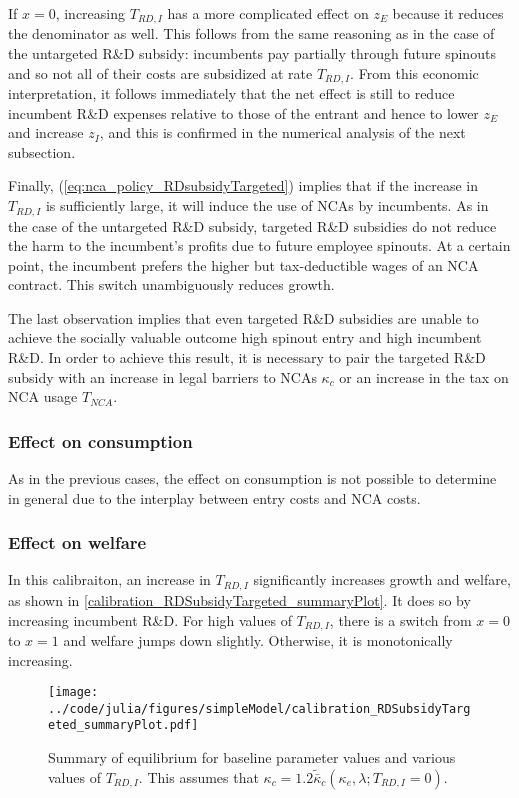 \documentclass[11pt,english]{article}
\theoremstyle{remark}
\begin{document}
If $x = 0$, increasing $T_{RD,I}$ has a more complicated effect on $z_E$ because it reduces the denominator as well. This follows from the same reasoning as in the case of the untargeted R\&D subsidy: incumbents pay partially through future spinouts and so not all of their costs are subsidized at rate $T_{RD,I}$. From this economic interpretation, it follows immediately that the net effect is still to reduce incumbent R\&D expenses relative to those of the entrant and hence to lower $z_E$ and increase $z_I$, and this is confirmed in the numerical analysis of the next subsection.

Finally, (\ref{eq:nca_policy_RDsubsidyTargeted}) implies that if the increase in $T_{RD,I}$ is sufficiently large, it will induce the use of NCAs by incumbents. As in the case of the untargeted R\&D subsidy, targeted R\&D subsidies do not reduce the harm to the incumbent's profits due to future employee spinouts. At a certain point, the incumbent prefers the higher but tax-deductible wages of an NCA contract. This switch unambiguously reduces growth.

The last observation implies that even targeted R\&D subsidies are unable to achieve the socially valuable outcome high spinout entry and high incumbent R\&D. In order to achieve this result, it is necessary to pair the targeted R\&D subsidy with an increase in legal barriers to NCAs $\kappa_c$ or an increase in the tax on NCA usage $T_{NCA}$. 

\subsubsection{Effect on consumption}

As in the previous cases, the effect on consumption is not possible to determine in general due to the interplay between entry costs and NCA costs. 

\subsubsection{Effect on welfare}

In this calibraiton, an increase in $T_{RD,I}$ significantly increases growth and welfare, as shown in \autoref{calibration_RDSubsidyTargeted_summaryPlot}. It does so by increasing incumbent R\&D. For high values of $T_{RD,I}$, there is a switch from $x = 0$ to $x = 1$ and welfare jumps down slightly. Otherwise, it is monotonically increasing. 

\begin{figure}[]
	\texttt{[image: ../code/julia/figures/simpleModel/calibration\_RDSubsidyTargeted\_summaryPlot.pdf]}
	\caption{Summary of equilibrium for baseline parameter values and various values of $T_{RD,I}$. This assumes that $\kappa_c = 1.2 \tilde{\bar{\kappa}}_c(\kappa_e,\lambda;T_{RD,I} = 0)$.}
	\label{calibration_RDSubsidyTargeted_summaryPlot}
\end{figure}
\end{document}
